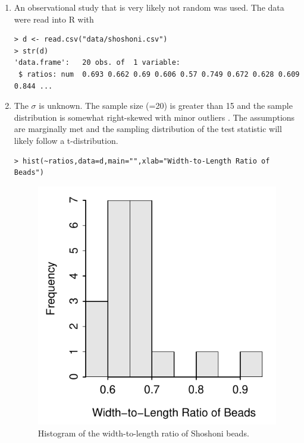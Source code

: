 \documentclass[10pt,openany]{book}\usepackage[]{graphicx}\usepackage[]{color}
\makeatletter
\newenvironment{kframe}{%
 \def\at@end@of@kframe{}%
 \ifinner\ifhmode%
  \def\at@end@of@kframe{\end{minipage}}%
  \begin{minipage}{\columnwidth}%
 \fi\fi%
 \def\FrameCommand##1{\hskip\@totalleftmargin \hskip-\fboxsep
 \colorbox{shadecolor}{##1}\hskip-\fboxsep
     \hskip-\linewidth \hskip-\@totalleftmargin \hskip\columnwidth}%
 \MakeFramed {\advance\hsize-\width
   \@totalleftmargin\z@ \linewidth\hsize
   \@setminipage}}%
 {\par\unskip\endMakeFramed%
 \at@end@of@kframe}
\newenvironment{knitrout}{}{} %
\makeatother
\begin{document}
\begin{itemize}
\begin{enumerate}
      \item An observational study that is very likely not random was used.  The data were read into R with
\begin{knitrout}
\color{fgcolor}\begin{kframe}
\begin{verbatim}
> d <- read.csv("data/shoshoni.csv")
> str(d)
'data.frame':	20 obs. of  1 variable:
 $ ratios: num  0.693 0.662 0.69 0.606 0.57 0.749 0.672 0.628 0.609 0.844 ...
\end{verbatim}
\end{kframe}
\end{knitrout}
      \item The $\sigma$ is unknown.  The sample size (=20) is greater than 15 and the sample distribution is somewhat right-skewed with minor outliers .  The assumptions are marginally met and the sampling distribution of the test statistic will likely follow a t-distribution.
\begin{knitrout}
\color{fgcolor}\begin{kframe}
\begin{verbatim}
> hist(~ratios,data=d,main="",xlab="Width-to-Length Ratio of Beads")
\end{verbatim}
\end{kframe}\begin{figure}[hbtp]

{\centering \includegraphics[width=.4\linewidth]{Figs/BeadsHist-1} 

}

\caption[Histogram of the width-to-length ratio of Shoshoni beads]{Histogram of the width-to-length ratio of Shoshoni beads.}\label{fig:BeadsHist}
\end{figure}



\end{knitrout}
\end{enumerate}
\end{itemize}
\end{document}

